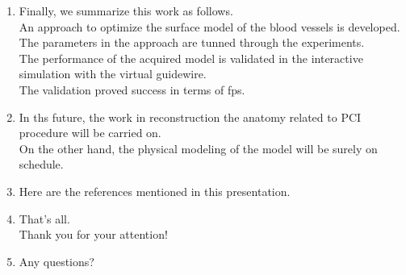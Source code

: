 \documentclass{article}
\begin{document}
\begin{enumerate}
\item Finally, we summarize this work as follows. \\
      An approach to optimize the surface model of the blood vessels is developed. \\
	  The parameters in the approach are tunned through the experiments. \\
	  The performance of the acquired model is validated in the interactive simulation with the virtual guidewire. \\
	  The validation proved success in terms of fps.

\item In ths future, the work in reconstruction the anatomy related to PCI procedure will be carried on.\\
      On the other hand, the physical modeling of the model will be surely on schedule.

\item Here are the references mentioned in this presentation.

\item That's all. \\
      Thank you for your attention!

\item Any questions?

\end{enumerate}
\end{document}
